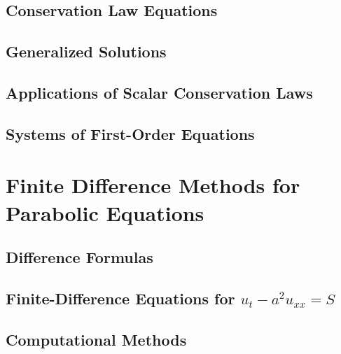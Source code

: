 \documentclass{amsbook}%
\theoremstyle{plain}
\numberwithin{equation}{section}
\begin{document}
	\section{Conservation Law Equations}
	
	\section{Generalized Solutions}
	
	\section{Applications of Scalar Conservation Laws}
	
	\section{Systems of First-Order Equations}

\chapter{Finite Difference Methods for Parabolic Equations}

	\section{Difference Formulas}
	
	\section{Finite-Difference Equations for $u_t-a^2u_{xx}=S$}

	\section{Computational Methods}
	
\end{document}
